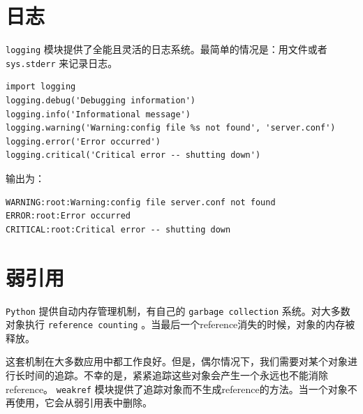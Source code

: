 \documentclass[10pt,a4paper,UTF8]{article}
\begin{document}
\section{日志}
\label{sec:org045fe20}


\texttt{logging} 模块提供了全能且灵活的日志系统。最简单的情况是：用文件或者 \texttt{sys.stderr} 来记录日志。

\begin{verbatim}
import logging
logging.debug('Debugging information')
logging.info('Informational message')
logging.warning('Warning:config file %s not found', 'server.conf')
logging.error('Error occurred')
logging.critical('Critical error -- shutting down')
\end{verbatim}

输出为：
\begin{verbatim}
WARNING:root:Warning:config file server.conf not found
ERROR:root:Error occurred
CRITICAL:root:Critical error -- shutting down
\end{verbatim}

\section{弱引用}
\label{sec:orge823e8e}


\texttt{Python} 提供自动内存管理机制，有自己的 \texttt{garbage collection} 系统。对大多数对象执行 \texttt{reference counting} 。当最后一个reference消失的时候，对象的内存被释放。

这套机制在大多数应用中都工作良好。但是，偶尔情况下，我们需要对某个对象进行长时间的追踪。不幸的是，紧紧追踪这些对象会产生一个永远也不能消除reference。 \texttt{weakref} 模块提供了追踪对象而不生成reference的方法。当一个对象不再使用，它会从弱引用表中删除。
\end{document}

